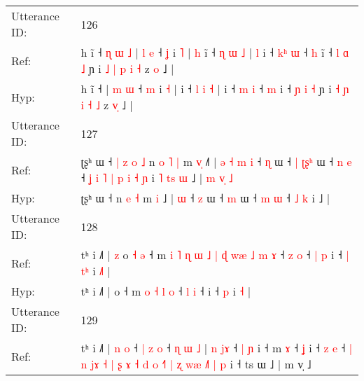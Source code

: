 \documentclass[10pt]{article}
\DeclareRobustCommand{\hl}[1]{{\textcolor{red}{#1}}}
\begin{document}
\begin{longtable}{ll}
\midrule
Utterance ID: & 126 \\
Ref: & h ĩ ˧\hl{ }\hl{ɳ}\hl{ }\hl{ɯ}\hl{ }\hl{˩} | \hl{l} \hl{e} ˧ \hl{ʝ} i \hl{˥} |\hl{ }\hl{h} i\hl{̃} ˧ \hl{ɳ} \hl{ɯ} \hl{˩} |\hl{ }\hl{l} i ˧ \hl{k}\hl{ʰ} \hl{ɯ} ˧ \hl{h} i\hl{̃} ˧ \hl{l} \hl{ɑ} \hl{˩} ɲ i \hl{˩} \hl{|} \hl{p} \hl{i} \hl{˧} z \hl{}\hl{o} ˩ |
 \\
Hyp: & h ĩ ˧\hl{}\hl{}\hl{}\hl{}\hl{}\hl{} | \hl{m} \hl{ɯ} ˧ \hl{m} i \hl{˧} |\hl{}\hl{} i\hl{} ˧ \hl{l} \hl{i} \hl{˧} |\hl{}\hl{} i ˧ \hl{}\hl{m} \hl{i} ˧ \hl{m} i\hl{} ˧ \hl{ɲ} \hl{i} \hl{˧} ɲ i \hl{˧} \hl{ɲ} \hl{i} \hl{˧} \hl{˩} z \hl{v}\hl{̩} ˩ |
 \\
\midrule
Utterance ID: & 127 \\
Ref: & ʈʂʰ ɯ ˧\hl{ }\hl{|}\hl{ }\hl{z}\hl{ }\hl{o}\hl{ }\hl{˩} n\hl{ }\hl{o} \hl{˥} \hl{|} m \hl{v}\hl{̩} ˩\hl{˥} |\hl{ }\hl{ə}\hl{ }\hl{˧}\hl{ }\hl{m} \hl{i} ˧ \hl{ɳ} ɯ ˧\hl{ }\hl{|} \hl{ʈ}\hl{ʂ}\hl{ʰ} ɯ ˧ \hl{n} \hl{e} ˧\hl{ }\hl{ʝ}\hl{ }\hl{i}\hl{ }\hl{˥}\hl{ }\hl{|}\hl{ }\hl{p}\hl{ }\hl{i} \hl{˧} \hl{ɲ} i\hl{ }\hl{˥}\hl{ }\hl{t}\hl{s}\hl{ }\hl{ɯ} ˩ |\hl{ }\hl{m}\hl{ }\hl{v}\hl{̩}\hl{ }\hl{˩}
 \\
Hyp: & ʈʂʰ ɯ ˧\hl{}\hl{}\hl{}\hl{}\hl{}\hl{}\hl{}\hl{} n\hl{}\hl{} \hl{e} \hl{˧} m \hl{}\hl{i} ˩\hl{} |\hl{}\hl{}\hl{}\hl{}\hl{}\hl{} \hl{ɯ} ˧ \hl{z} ɯ ˧\hl{}\hl{} \hl{}\hl{}\hl{m} ɯ ˧ \hl{m} \hl{ɯ} ˧\hl{}\hl{}\hl{}\hl{}\hl{}\hl{}\hl{}\hl{}\hl{}\hl{}\hl{}\hl{} \hl{˩} \hl{k} i\hl{}\hl{}\hl{}\hl{}\hl{}\hl{}\hl{} ˩ |\hl{}\hl{}\hl{}\hl{}\hl{}\hl{}\hl{}
 \\
\midrule
Utterance ID: & 128 \\
Ref: & tʰ i ˩˥ |\hl{ }\hl{z} o\hl{ }\hl{˧}\hl{ }\hl{ə} ˧ m\hl{ }\hl{i}\hl{ }\hl{˥}\hl{ }\hl{ɳ}\hl{ }\hl{ɯ}\hl{ }\hl{˩}\hl{ }\hl{|}\hl{ }\hl{ɖ} \hl{w}\hl{æ} \hl{˩} \hl{m} \hl{ɤ} ˧ \hl{z} \hl{o} ˧\hl{ }\hl{|}\hl{ }\hl{p} i ˧\hl{ }\hl{|} \hl{t}\hl{ʰ} i \hl{˩}\hl{˥} |
 \\
Hyp: & tʰ i ˩˥ |\hl{}\hl{} o\hl{}\hl{}\hl{}\hl{} ˧ m\hl{}\hl{}\hl{}\hl{}\hl{}\hl{}\hl{}\hl{}\hl{}\hl{}\hl{}\hl{}\hl{}\hl{} \hl{}\hl{o} \hl{˧} \hl{l} \hl{o} ˧ \hl{l} \hl{i} ˧\hl{}\hl{}\hl{}\hl{} i ˧\hl{}\hl{} \hl{}\hl{p} i \hl{}\hl{˧} |
 \\
\midrule
Utterance ID: & 129 \\
Ref: & tʰ i ˩˥ | \hl{n} \hl{o} ˧\hl{ }\hl{|} \hl{z} \hl{o} ˧ \hl{ɳ} \hl{ɯ} \hl{˩} |\hl{ }\hl{n} \hl{j}\hl{ɤ} ˧\hl{ }\hl{|} \hl{ɲ} i ˧ m \hl{ɤ} ˧ \hl{ʝ} i ˧ \hl{z} \hl{e} ˧ \hl{|} \hl{n} \hl{j}\hl{ɤ} \hl{˧} \hl{|} \hl{ʂ} \hl{ɤ} \hl{˧} \hl{d} \hl{o} \hl{˧}\hl{˥} \hl{|} \hl{ʐ} \hl{w}\hl{æ} \hl{˩}\hl{˥} \hl{|} \hl{p} i ˧ ts ɯ ˩ | m v̩ ˩

\end{longtable}
\end{document}
